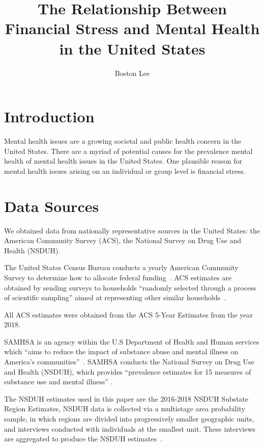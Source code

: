 \documentclass{article}
\title{The Relationship Between Financial Stress and Mental Health in the United States}
\author{Boston Lee}
\begin{document}
\maketitle

\pagebreak

\section{Introduction}

Mental health issues are a growing societal and public health concern
in the United States.
There are a myriad of potential causes for the prevalence mental health
of mental health issues in the United States.
One plausible reason for mental health issues arising
on an individual or group level
is financial stress.

\section{Data Sources}

We obtained data from nationally representative sources
in the United States:
the American Community Survey (ACS),
the National Survey on Drug Use and Health (NSDUH).

The United States Census Bureau
conducts a yearly American Community Survey
to determine how to allocate federal
funding~\cite{acs_description}.
ACS estimates are obtained by
sending surveys to households
``randomly selected through a process of scientific sampling''
aimed at representing other similar households~\cite{acs_sampling}.


All ACS estimates were obtained from
the ACS 5-Year Estimates from the year 2018.

SAMHSA is an agency within
the U.S Department of Health and Human services which
``aims to reduce the impact of substance abuse and mental
illness on America's communities''~\cite{samhsa_about_us}.
SAMHSA conducts
the National Survey on Drug Use and Health (NSDUH),
which provides
``prevalence estimates for 15 measures of substance use and mental illness''
\cite{samhsa_data}.

The NSDUH estimates used in this paper are the
2016-2018 NSDUH Substate Region Estimates,
NSDUH data is collected via a multistage area probability sample,
in which regions are divided
into progressively smaller geographic units,
and interviews conducted with individuals at the smallest unit.
These interviews are aggregated to produce the NSDUH
estimates~\cite{nsduh_description}.
\end{document}
